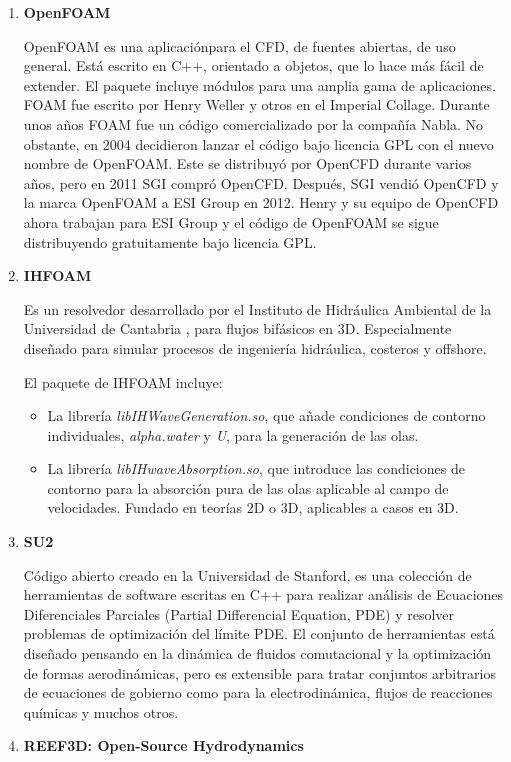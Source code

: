 \begin{enumerate}
\def\labelenumi{\arabic{enumi}.}
\item
  \textbf{OpenFOAM} \cite{OpenFOAMfundation}

OpenFOAM es una aplicaciónpara el CFD, de fuentes abiertas, de uso general. Está
escrito en C++, orientado a objetos, que lo hace más fácil de extender.
El paquete incluye módulos para una amplia gama de aplicaciones. FOAM
fue escrito por Henry Weller y otros en el Imperial Collage. Durante
unos años FOAM fue un código comercializado por la compañía Nabla. No
obstante, en 2004 decidieron lanzar el código bajo licencia GPL con el
nuevo nombre de OpenFOAM. Este se distribuyó por OpenCFD durante varios
años, pero en 2011 SGI compró OpenCFD. Después, SGI vendió OpenCFD y la
marca OpenFOAM a ESI Group en 2012. Henry y su equipo de OpenCFD ahora
trabajan para ESI Group y el código de OpenFOAM se sigue distribuyendo
gratuitamente bajo licencia GPL.

\item
  \textbf{IHFOAM} \cite{IHFOAM}

Es un resolvedor desarrollado por el Instituto de Hidráulica Ambiental
de la Universidad de Cantabria \cite{ihF}, para flujos
bifásicos en 3D. Especialmente diseñado para simular procesos de
ingeniería hidráulica, costeros y offshore.

El paquete de IHFOAM incluye:

\begin{itemize}
\item
  La librería \emph{libIHWaveGeneration.so}, que añade condiciones de
  contorno individuales, \emph{alpha.water} y \emph{U}, para la
  generación de las olas.
\item
  La librería \emph{libIHwaveAbsorption.so}, que introduce las
  condiciones de contorno para la absorción pura de las olas aplicable
  al campo de velocidades. Fundado en teorías 2D o 3D, aplicables a
  casos en 3D.
\end{itemize}
\item
  \textbf{SU2} \cite{cfd-online_6}

Código abierto creado en la Universidad de Stanford, es una colección de
herramientas de software escritas en C++ para realizar análisis de
Ecuaciones Diferenciales Parciales (Partial Differencial Equation, PDE)
y resolver problemas de optimización del límite PDE. El conjunto de
herramientas está diseñado pensando en la dinámica de fluidos
comutacional y la optimización de formas aerodinámicas, pero es
extensible para tratar conjuntos arbitrarios de ecuaciones de gobierno
como para la electrodinámica, flujos de reacciones químicas y muchos
otros.
\item
  \textbf{REEF3D: Open-Source Hydrodynamics} \cite{REEF3D}


\end{enumerate}
